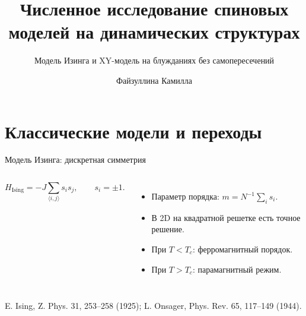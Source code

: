 \documentclass[t,aspectratio=169]{beamer}
\title{Численное исследование спиновых моделей на динамических структурах}
\subtitle{Модель Изинга и XY-модель на блужданиях без самопересечений}
\author{Файзуллина Камилла}
\institute{Научный руководитель: Л.Н. Щур}
\date{}
\newcommand{\source}[1]{\vfill{\tiny\raggedright #1\par}}
\begin{document}
\begin{frame}[plain]
  \titlepage
\end{frame}

\section{Классические модели и переходы}

\begin{frame}{Модель Изинга: дискретная симметрия}
  \begin{columns}[T,onlytextwidth]
    \small
    \[
      H_{\mathrm{Ising}}
      = -J\sum_{\langle i,j\rangle} s_i s_j,\qquad
      s_i=\pm1 .
    \]
    \begin{itemize}
      \item Параметр порядка: \(m=N^{-1}\sum_i s_i\).
      \item В 2D на квадратной решетке есть точное решение.
      \item При \(T<T_c\): ферромагнитный порядок.
      \item При \(T>T_c\): парамагнитный режим.
    \end{itemize}
    \centering
  \end{columns}
  \source{E. Ising, Z. Phys. 31, 253--258 (1925); L. Onsager, Phys. Rev. 65, 117--149 (1944).}
\end{frame}
\end{document}
